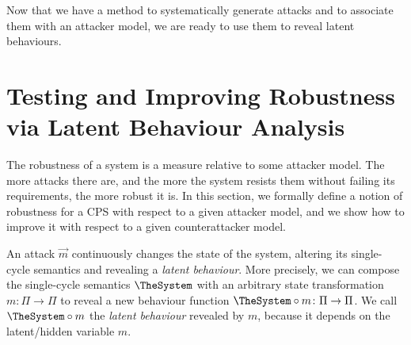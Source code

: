 {%

Now that we have a method to systematically generate attacks and to associate them with an attacker model, we are ready to use them to reveal latent behaviours. 

\section{Testing and Improving Robustness via Latent Behaviour Analysis}
\label{sec:LatentBehaviours}
The robustness of a system is a measure relative to some attacker model. The more attacks there are, and the more the system resists them without failing its requirements, the more robust it is. In this section, we formally define a notion of robustness for a CPS with respect to a given attacker model, and we show how to improve it with respect to a given counterattacker model.

An attack $\vec{m}$ continuously changes the state of the system, altering its single-cycle semantics and revealing a \emph{latent behaviour}. More precisely, we can compose the single-cycle semantics $\TheSystem$ with an arbitrary state transformation $m\colon \Pi\rightarrow\Pi$ to reveal a new behaviour function $\TheSystem\circ m\colon\Pi\rightarrow\Pi$. We call $\TheSystem\circ m$ the \emph{latent behaviour} revealed by $m$, because it depends on the latent/hidden variable $m$. 

}
